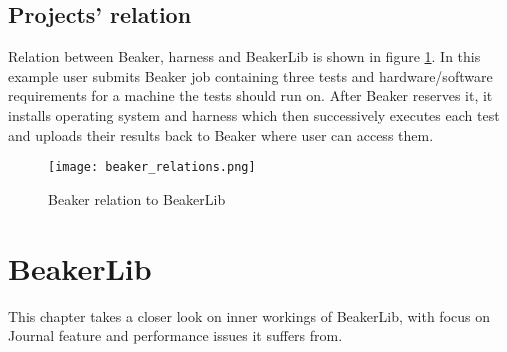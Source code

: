 \section{Projects' relation}
Relation between Beaker, harness and BeakerLib is shown in figure \ref{fig:beaker_relation}. In this example user submits Beaker job containing three tests and hardware/software requirements for a machine the tests should run on. After Beaker reserves it, it installs operating system and harness which then successively executes each test and uploads their results back to Beaker where user can access them.

\begin{figure}
  \texttt{[image: beaker\_relations.png]}
  \caption{Beaker relation to BeakerLib}
  \label{fig:beaker_relation}
\end{figure}

\chapter{BeakerLib}
\label{beakerlib_chapter}

This chapter takes a closer look on inner workings of BeakerLib, with focus on Journal feature and performance issues it suffers from. 

